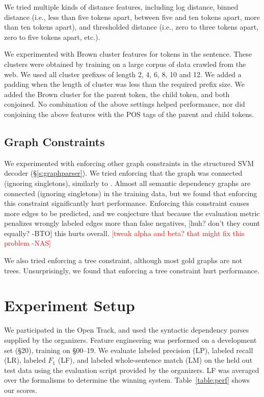 \documentclass[11pt]{article}
\newcommand{\bocomment}[1]{\textcolor{Bittersweet}{[#1 -BTO]}}
\newcommand{\nas}[1]{\textcolor{red}{[#1 -NAS]}}
\begin{document}
We tried multiple kinds of distance features, including log distance, binned
distance (i.e., less than five tokens apart, between five and ten tokens apart, more than
ten tokens apart), and thresholded distance (i.e., zero to three tokens apart,
zero to five tokens apart, etc.).


We experimented with Brown cluster features \cite{Brown:1992:CNG:176313.176316}
for tokens in the sentence.
These clusters were obtained by training on a large corpus of data crawled from
the web.
We used all cluster prefixes of length 2, 4, 6, 8, 10 and 12.
We added a padding when the length of cluster was less than the required prefix
size.
We added the Brown cluster for the parent token, the child token, and both
conjoined.
No combination of the above settings helped performance, nor did conjoining the above features with the POS tags of the parent and
child tokens.

\subsection{Graph Constraints}
\label{s:badconstraints}

We experimented with enforcing other graph constraints in the structured SVM
decoder (\S\ref{s:graphparser}).
We tried enforcing that the graph was connected (ignoring singletons), similarly
to .
Almost all semantic dependency graphs are connected (ignoring singletons) in the
training data, but we found that enforcing this constraint significantly hurt
performance.
Enforcing this constraint causes more edges to be predicted, and we conjecture
that because the evaluation metric penalizes wrongly labeled edges more than
false negatives, 
\bocomment{huh? don't they count equally?}
this hurts overall. \nas{tweak alpha and beta?  that might fix this problem}

We also tried enforcing a tree constraint, although most gold graphs are not
trees.
Unsurprisingly, we found that enforcing a tree constraint hurt performance.



\section{Experiment Setup}
\label{s:evaluation}

We participated in the Open Track, and used the syntactic dependency parses supplied by the organizers.  Feature engineering was performed on a development set (\S 20), training on \S 00--19.
We evaluate labeled precision (LP), labeled recall (LR), labeled $F_1$ (LF), and
labeled whole-sentence match (LM) on the held out test data using the
evaluation script provided by the organizers. 
LF was averaged over the formalisms to determine the winning system.
Table~\ref{table:perf} shows our scores.
\end{document}

